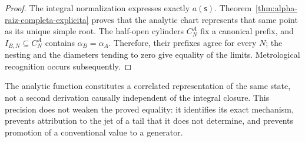 \begin{proof}
The integral normalization expresses exactly \(a(\mathsf s)\).
Theorem~\ref{thm:alpha-raiz-completa-explicita} proves that the analytic chart
represents that same point as its unique simple root. The half-open cylinders
\(C_N^A\) fix a canonical prefix, and \(I_{B,N}\subseteq C_N^A\) contains
\(\alpha_B=\alpha_A\). Therefore, their prefixes agree for every \(N\); the
nesting and the diameters tending to zero give equality of the limits.
Metrological recognition occurs subsequently.
\end{proof}

The analytic function constitutes a correlated representation of the same
state, not a second derivation causally independent of the integral closure.
This precision does not weaken the proved equality: it identifies its exact
mechanism, prevents attribution to the jet of a tail that it does not
determine, and prevents promotion of a conventional value to a generator.

